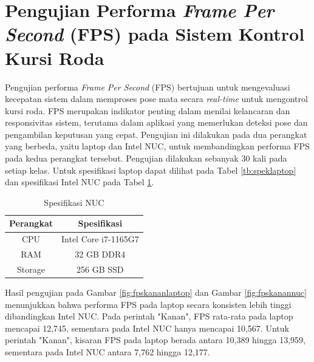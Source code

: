 \section{Pengujian Performa \emph{Frame Per Second} (FPS) pada Sistem Kontrol Kursi Roda}

Pengujian performa \emph{Frame Per Second} (FPS) bertujuan untuk mengevaluasi kecepatan sistem dalam memproses pose mata secara \emph{real-time} untuk mengontrol kursi roda. FPS merupakan indikator penting dalam menilai kelancaran dan responsivitas sistem, terutama dalam aplikasi yang memerlukan deteksi pose dan pengambilan keputusan yang cepat. Pengujian ini dilakukan pada dua perangkat yang berbeda, yaitu laptop dan Intel NUC, untuk membandingkan performa FPS pada kedua perangkat tersebut. Pengujian dilakukan sebanyak 30 kali pada setiap kelas. Untuk spesifikasi laptop dapat dilihat pada Tabel \ref{tb:speklaptop} dan spesifikasi Intel NUC pada Tabel \ref{tb:speknuc}.

\begin{longtable}{|c|c|}
  \caption{Spesifikasi NUC}
  \label{tb:speknuc} \\
  \hline
  \rowcolor[HTML]{D9D9D9} 
  \textbf{Perangkat} & \textbf{Spesifikasi}   \\ \hline
  CPU                & Intel Core   i7-1165G7 \\ \hline
  RAM                & 32 GB DDR4             \\ \hline
  Storage            & 256 GB SSD             \\ \hline
\end{longtable}

Hasil pengujian pada Gambar \ref{fig:fpskananlaptop} dan Gambar \ref{fig:fpskanannuc} menunjukkan bahwa performa FPS pada laptop secara konsisten lebih tinggi dibandingkan Intel NUC. Pada perintah "Kanan", FPS rata-rata pada laptop mencapai 12,745, sementara pada Intel NUC hanya mencapai 10,567. Untuk perintah "Kanan", kisaran FPS pada laptop berada antara 10,389 hingga 13,959, sementara pada Intel NUC antara 7,762 hingga 12,177.

